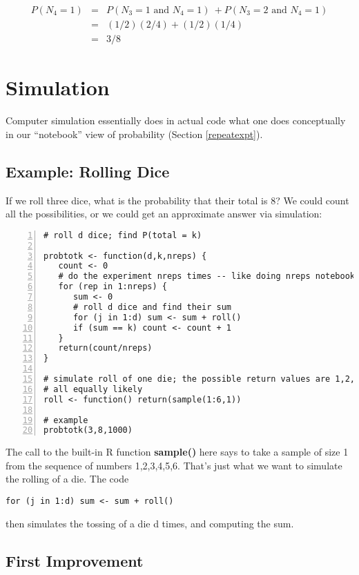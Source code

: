 \begin{eqnarray}
P(N_4 = 1)
&=& P(N_3 = 1 \textrm{ and } N_4 = 1) \
+ P(N_3 = 2 \textrm{ and } N_4 = 1) \\ 
&=& (1/2) (2/4) + (1/2) (1/4) \\
&=& 3/8
\end{eqnarray}

\section{Simulation}

Computer simulation essentially does in actual code what one does
conceptually in our ``notebook'' view of probability (Section
\ref{repeatexpt}). 

\subsection{Example:  Rolling Dice}

If we roll three dice, what is the probability that their total is 8?
We could count all the possibilities, or we could get an approximate answer
via simulation:

\begin{Verbatim}[fontsize=\relsize{-2},numbers=left]
# roll d dice; find P(total = k)

probtotk <- function(d,k,nreps) {
   count <- 0
   # do the experiment nreps times -- like doing nreps notebook lines
   for (rep in 1:nreps) {
      sum <- 0
      # roll d dice and find their sum
      for (j in 1:d) sum <- sum + roll()
      if (sum == k) count <- count + 1
   }
   return(count/nreps)
}

# simulate roll of one die; the possible return values are 1,2,3,4,5,6,
# all equally likely
roll <- function() return(sample(1:6,1))

# example
probtotk(3,8,1000)
\end{Verbatim}

The call to the built-in R function {\bf sample()} here says to take a
sample of size 1 from the sequence of numbers 1,2,3,4,5,6.  That's just
what we want to simulate the rolling of a die.  The code

\begin{Verbatim}[fontsize=\relsize{-2}]
for (j in 1:d) sum <- sum + roll()
\end{Verbatim}

then simulates the tossing of a die d times, and computing the sum.

\subsection{First Improvement}
\label{improvingsimcode}

